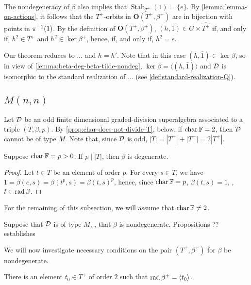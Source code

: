 The nondegeneracy of $\beta$ also implies that $\operatorname{Stab}_{T^+} (1) = \{e \}$. 
By \cref{lemma:lemma-on-actions}, it follows that the $T^+$-orbits in $\mathbf {O} (T^+, \beta^+)$ are in bijection with points in $\pi^{-1} (1)$. 
By the definition of $\mathbf {O} (T^+, \beta^+)$, $(h, 1) \in G \times \widehat{T^+}$ if, and only if, $h^2 \in T^+$ and $h^2 \in \ker \beta^+$, hence, if, and only if, $h^2 = e$. 

Our theorem reduces to ... and $h = h'$. 
Note that in this case $(h, \bar 1) \in \ker \beta$, so in view of \cref{lemma:beta-deg-beta-tilde-nondeg}, $\ker \beta = \langle (h, \bar 1) \rangle$ and $\mathcal{D}$ is isomorphic to the standard realization of ... (see \cref{def:standard-realization-Q}).

\subsection{\texorpdfstring{$M(n,n)$}{M(n,n)}}

Let $\mathcal{D}$ be an odd finite dimensional graded-division superalgebra associated to a triple $(T, \beta, p)$. 
By \cref{prop:char-does-not-divide-T}, below, if $\operatorname{char} \mathbb{F} = 2$, then $\mathcal{D}$ cannot be of type $M$. 
Note that, since $\mathcal{D}$ is odd, $|T| = |T^+| + |T^-| = 2|T^+|$.

\begin{prop}\label{prop:char-does-not-divide-T}
    Suppose $\operatorname{char} \mathbb{F} = p > 0$. 
    If $p \mid |T|$, then $\beta$ is degenerate.
\end{prop}

\begin{proof}
    Let $t\in T$ be an element of order $p$. 
    For every $s\in T$, we have $1 = \beta(e, s) = \beta(t^p, s) = \beta(t, s)^p$, hence, since $\operatorname{char} \mathbb{F} = p$, $\beta(t, s) = 1$, \ie, $t\in \operatorname{rad} \beta$. 
\end{proof}
 
For the remaining of this subsection, we will assume that $\operatorname{char} \mathbb{F} \neq 2$.

Suppose that $\mathcal{D}$ is of type $M$, \ie, that $\beta$ is nondegenerate. 
Propositions ?? establishes

We will now investigate necessary conditions on the pair $(T^+, \beta^+)$ for $\beta$ be nondegenerate. 


\begin{prop}\label{prop:parity-element}
    There is an element $t_0 \in T^+$ of order $2$ such that $\operatorname{rad} \beta^+ = \langle t_0 \rangle$.
\end{prop}

